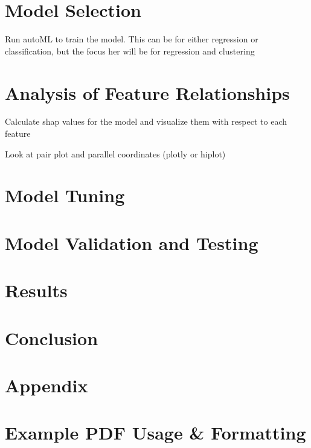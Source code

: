 \documentclass[
  letterpaper,
  DIV=11,
  numbers=noendperiod]{scrartcl}
\begin{document}
\section{Model Selection}\label{model-selection}

Run autoML to train the model. This can be for either regression or
classification, but the focus her will be for regression and clustering

\section{Analysis of Feature
Relationships}\label{analysis-of-feature-relationships}

Calculate shap values for the model and visualize them with respect to
each feature

Look at pair plot and parallel coordinates (plotly or hiplot)

\section{Model Tuning}\label{model-tuning}

\section{Model Validation and
Testing}\label{model-validation-and-testing}

\section{Results}\label{results}

\section{Conclusion}\label{conclusion}

\section{Appendix}\label{appendix}

\section{Example PDF Usage \&
Formatting}\label{example-pdf-usage-formatting}
\end{document}
